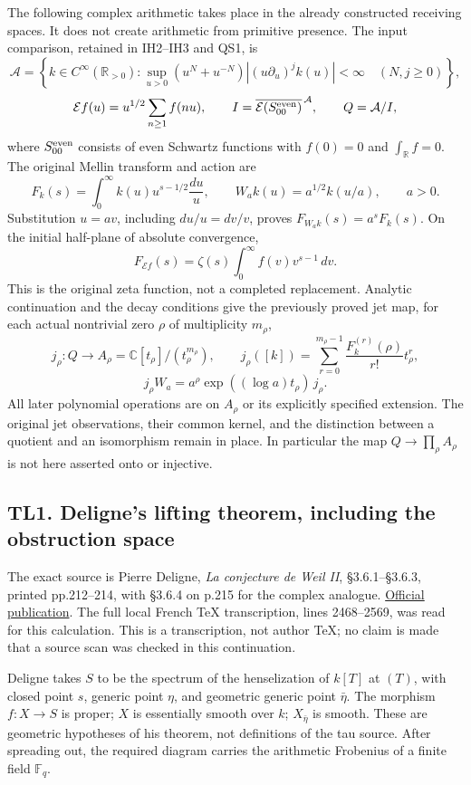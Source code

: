 The following complex arithmetic takes place in the already constructed
receiving spaces. It does not create arithmetic from primitive presence.
The input comparison, retained in IH2--IH3 and QS1, is \[
\mathcal A=\left\{k\in C^\infty(\mathbb R_{>0}):
\sup_{u>0}(u^N+u^{-N})|(u\partial_u)^j k(u)|<\infty
\quad(N,j\ge0)\right\},
\] \[
\mathcal E f(u)=u^{1/2}\sum_{n\ge1}f(nu),\qquad
I=\overline{\mathcal E(S_{00}^{\rm even})}^{\,\mathcal A},
\qquad Q=\mathcal A/I,
\] where \(S_{00}^{\rm even}\) consists of even Schwartz functions with
\(f(0)=0\) and \(\int_{\mathbb R}f=0\). The original Mellin transform
and action are \[
F_k(s)=\int_0^\infty k(u)u^{s-1/2}\frac{du}{u},\qquad
W_a k(u)=a^{1/2}k(u/a),\qquad a>0.
\tag{TL0.1}
\] Substitution \(u=av\), including \(du/u=dv/v\), proves
\(F_{W_a k}(s)=a^sF_k(s)\). On the initial half-plane of absolute
convergence, \[
F_{\mathcal E f}(s)=\zeta(s)\int_0^\infty f(v)v^{s-1}\,dv.
\tag{TL0.2}
\] This is the original zeta function, not a completed replacement.
Analytic continuation and the decay conditions give the previously
proved jet map, for each actual nontrivial zero \(\rho\) of multiplicity
\(m_\rho\), \[
j_\rho:Q\longrightarrow A_\rho=\mathbb C[t_\rho]/(t_\rho^{m_\rho}),\qquad
j_\rho([k])=\sum_{r=0}^{m_\rho-1}
\frac{F_k^{(r)}(\rho)}{r!}t_\rho^r,
\] \[
j_\rho W_a=a^\rho\exp((\log a)t_\rho)\,j_\rho.
\tag{TL0.3}
\] All later polynomial operations are on \(A_\rho\) or its explicitly
specified extension. The original jet observations, their common kernel,
and the distinction between a quotient and an isomorphism remain in
place. In particular the map \(Q\to\prod_\rho A_\rho\) is not here
asserted onto or injective.

\subsection{TL1. Deligne's lifting theorem, including the obstruction
space}\label{tl1.-delignes-lifting-theorem-including-the-obstruction-space}

The exact source is Pierre Deligne, \emph{La conjecture de Weil II},
§3.6.1--§3.6.3, printed pp.212--214, with §3.6.4 on p.215 for the
complex analogue.
\href{https://www.numdam.org/item/PMIHES_1980__52__137_0/}{Official
publication}. The full local French TeX transcription, lines 2468--2569,
was read for this calculation. This is a transcription, not author TeX;
no claim is made that a source scan was checked in this continuation.

Deligne takes \(S\) to be the spectrum of the henselization of \(k[T]\)
at \((T)\), with closed point \(s\), generic point \(\eta\), and
geometric generic point \(\bar\eta\). The morphism \(f:X\to S\) is
proper; \(X\) is essentially smooth over \(k\); \(X_{\bar\eta}\) is
smooth. These are geometric hypotheses of his theorem, not definitions
of the tau source. After spreading out, the required diagram carries the
arithmetic Frobenius of a finite field \(\mathbb F_q\).

